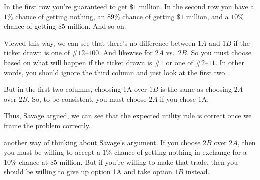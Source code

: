 \documentclass[justified]{tufte-book}
\theoremstyle{definition}
\theoremstyle{definition}
\theoremstyle{definition}
\theoremstyle{definition}
\theoremstyle{remark}
\begin{document}
In the first row you're guaranteed to get \(\$1\) million. In the second row you have a \(1\%\) chance of getting nothing, an \(89\%\) chance of getting \(\$1\) million, and a \(10\%\) chance of getting \(\$5\) million. And so on.

Viewed this way, we can see that there's no difference between \(1A\) and \(1B\) if the ticket drawn is one of \(\#12\)--\(100\). And likewise for \(2A\) vs.~\(2B\). So you must choose based on what will happen if the ticket drawn is \(\#1\) or one of \(\#2\)--\(11\). In other words, you should ignore the third column and just look at the first two.

But in the first two columns, choosing 1A over \(1B\) is the same as choosing \(2A\) over \(2B\). So, to be consistent, you must choose \(2A\) if you chose 1A.

Thus, Savage argued, we can see that the expected utility rule is correct once we frame the problem correctly.

 another way of thinking about Savage's argument. If you choose \(2B\) over \(2A\), then you must be willing to accept a \(1\%\) chance of getting nothing in exchange for a \(10\%\) chance at \(\$5\) million. But if you're willing to make that trade, then you should be willing to give up option 1A and take option \(1B\) instead.
\end{document}
